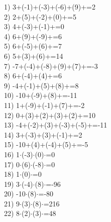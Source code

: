 \documentclass[a4paper,10pt]{article}
\begin{document}
1)   3+(-1)+(-3)+(-6)+(9)+=2
\vspace{0.5cm}\\2)   2+(5)+(-2)+(0)+=5
\vspace{0.5cm}\\3)   4+(-3)+(-1)+=0
\vspace{0.5cm}\\4)   6+(9)+(-9)+=6
\vspace{0.5cm}\\5)   6+(-5)+(6)+=7
\vspace{0.5cm}\\6)   5+(3)+(6)+=14
\vspace{0.5cm}\\7)   -7+(-4)+(-8)+(9)+(7)+=-3
\vspace{0.5cm}\\8)   6+(-4)+(4)+=6
\vspace{0.5cm}\\9)   -4+(-1)+(5)+(8)+=8
\vspace{0.5cm}\\10)   -10+(-9)+(8)+=-11
\vspace{0.5cm}\\11)   1+(-9)+(-1)+(7)+=-2
\vspace{0.5cm}\\12)   0+(3)+(2)+(3)+(2)+=10
\vspace{0.5cm}\\13)   -4+(-2)+(3)+(-3)+(-5)+=-11
\vspace{0.5cm}\\14)   3+(-3)+(3)+(-1)+=2
\vspace{0.5cm}\\15)   -10+(4)+(-4)+(5)+=-5
\vspace{0.5cm}\\16)   1$\cdot$(-3)$\cdot$(0)$\cdot$=0
\vspace{0.5cm}\\17)   0$\cdot$(6)$\cdot$(-8)$\cdot$=0
\vspace{0.5cm}\\18)   1$\cdot$(0)$\cdot$=0
\vspace{0.5cm}\\19)   3$\cdot$(-4)$\cdot$(8)$\cdot$=-96
\vspace{0.5cm}\\20)   -10$\cdot$(8)$\cdot$=-80
\vspace{0.5cm}\\21)   9$\cdot$(3)$\cdot$(8)$\cdot$=216
\vspace{0.5cm}\\22)   8$\cdot$(2)$\cdot$(3)$\cdot$=48
\end{document}
